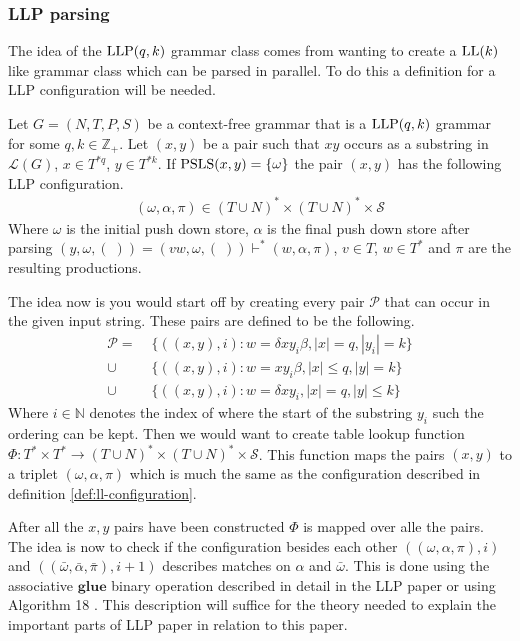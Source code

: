 \subsubsection{LLP parsing}
The idea of the $\text{LLP}(q, k)$ grammar class comes from wanting to create a $\text{LL}(k)$ like grammar class which can be parsed in parallel. To do this a definition for a LLP configuration will be needed.
\begin{definition}
    \label{def:llp-configuration}
    Let $G = (N, T, P, S)$ be a context-free grammar that is a $\text{LLP}(q, k)$ grammar for some $q, k \in \mathbb{Z}_+$. Let $(x, y)$ be a pair such that $xy$ occurs as a substring in $\mathcal{L}(G)$, $x \in T^{*q}$, $y \in T^{*k}$. If $\text{PSLS}(x,y) = \{\omega\}$ the pair $(x, y)$ has the following LLP configuration.
    \begin{align*}
        (\omega, \alpha, \pi) \in (T \cup N)^* \times (T \cup N)^* \times \mathcal{S}
    \end{align*}
    Where $\omega$ is the initial push down store, $\alpha$ is the final push down store after parsing $(y, \omega, (\;)) = (vw, \omega, (\;)) \vdash^* (w, \alpha, \pi)$, $v \in T$, $w \in T^*$ and $\pi$ are the resulting productions.
\end{definition}
\noindent The idea now is you would start off by creating every pair $\mathcal{P}$ that can occur in the given input string. These pairs are defined to be the following.
\begin{align*}
    \mathcal{P} =&\; \{((x, y), i) : w = \delta xy_i \beta, |x| = q, |y_i| = k\} \\
    \cup&\; \{((x, y), i) : w = xy_i \beta, |x| \leq q, |y| = k\} \\
    \cup&\; \{((x, y), i) : w = \delta xy_i, |x| = q, |y| \leq k\}
\end{align*}
Where $i \in \mathbb{N}$ denotes the index of where the start of the substring $y_i$ such the ordering can be kept. Then we would want to create table lookup function $\Phi: T^* \times T^* \to (T \cup N)^* \times (T \cup N)^* \times \mathcal{S}$. This function maps the pairs $(x,y)$ to a triplet $(\omega, \alpha, \pi)$ which is much the same as the configuration described in definition \ref{def:ll-configuration}. 

After all the $x, y$ pairs have been constructed $\Phi$ is mapped over alle the pairs. The idea is now to check if the configuration besides each other $((\omega, \alpha, \pi), i)$ and $((\bar{\omega}, \bar{\alpha}, \bar{\pi}), i + 1)$ describes matches on $\alpha$ and $\bar{\omega}$. This is done using the associative $\mathbf{glue}$ binary operation described in detail in the LLP paper \cite[7]{Vagner2007} or using Algorithm 18 \cite[18]{Vagner2007}. This description will suffice for the theory needed to explain the important parts of LLP paper \cite{Vagner2007} in relation to this paper.

